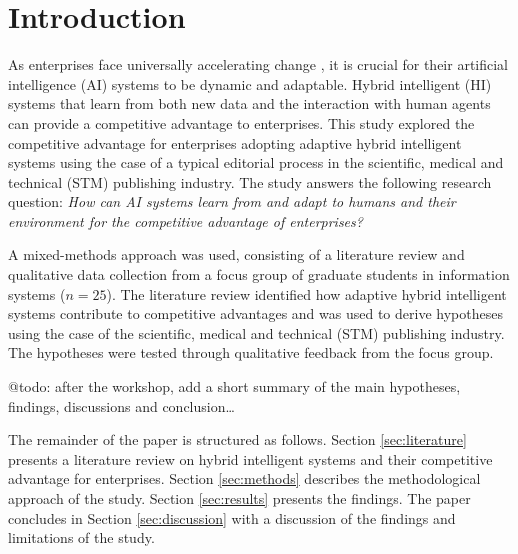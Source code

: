 \section{Introduction}
\label{sec:introduction}

As enterprises face universally accelerating change \citep{eliazarUniversalityAcceleratingChange2018}, it
is crucial for their artificial intelligence (AI) systems to be dynamic and adaptable. Hybrid intelligent (HI)
systems that learn from both new data and the interaction with human agents can provide a competitive advantage
to enterprises. This study explored the competitive advantage for enterprises adopting adaptive hybrid intelligent
systems using the case of a typical editorial process in the scientific, medical and technical (STM) publishing
industry. The study answers the following research question: \textit{How can AI systems learn from and adapt
to humans and their environment for the competitive advantage of enterprises?}

A mixed-methods approach was used, consisting of a literature review and qualitative data collection from
a focus group of graduate students in information systems ($n = 25$). The literature review identified how 
adaptive hybrid intelligent systems contribute to competitive advantages and was used to derive hypotheses
using the case of the scientific, medical and technical (STM) publishing industry. The hypotheses were
tested through qualitative feedback from the focus group.

{\color{purple} @todo: after the workshop, add a short summary of the main hypotheses, findings, 
discussions and conclusion\dots}

The remainder of the paper is structured as follows. Section \ref{sec:literature} presents a literature review
on hybrid intelligent systems and their competitive advantage for enterprises. Section \ref{sec:methods} describes
the methodological approach of the study. Section \ref{sec:results} presents the findings. The paper concludes in
Section \ref{sec:discussion} with a discussion of the findings and limitations of the study.